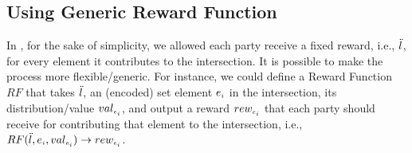 \subsection{Using Generic Reward Function}
In \epsi, for the sake of simplicity, we allowed each party receive a fixed reward, i.e., $\ddot{l}$, for every element it contributes to the intersection. It is possible to make the process more flexible/generic. For instance, we could define a Reward Function $RF$ that takes $\ddot{l}$, an (encoded) set element $e_{\scriptscriptstyle i}$ in the intersection, its distribution/value $val_{\scriptscriptstyle e_{\scriptscriptstyle i}}$, and output a reward $rew_{\scriptscriptstyle e_{\scriptscriptstyle i}}$ that each party should receive for contributing that element to the intersection, i.e., $RF(\ddot{l}, e_{\scriptscriptstyle i}, val_{\scriptscriptstyle e_{\scriptscriptstyle i}})\rightarrow rew_{\scriptscriptstyle e_{\scriptscriptstyle i}}$.





 